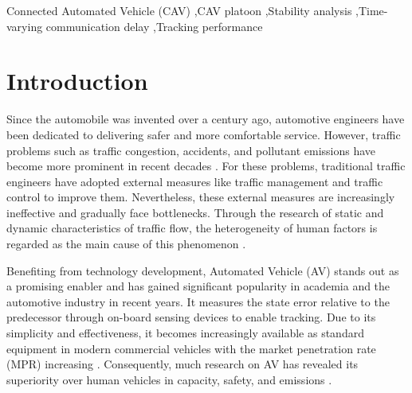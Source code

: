 \documentclass[a4paper]{cas-sc}
\begin{document}
\begin{keywords}
  Connected Automated Vehicle (CAV) \sep CAV platoon \sep Stability analysis \sep Time-varying communication delay \sep Tracking performance
\end{keywords}


\maketitle

\section{Introduction}
\label{Section 1}
Since the automobile was invented over a century ago, automotive engineers have been dedicated to delivering safer and more comfortable service. However, traffic problems such as traffic congestion, accidents, and pollutant emissions have become more prominent in recent decades \citep{schrank_urban_2019,Jin2016,ruan_impacts_2022}. For these problems, traditional traffic engineers have adopted external measures like traffic management and traffic control to improve them. Nevertheless, these external measures are increasingly ineffective and gradually face bottlenecks. Through the research of static and dynamic characteristics of traffic flow, the heterogeneity of human factors is regarded as the main cause of this phenomenon \citep{Zhong2020,Arem2016,Ye2018,Ruan2021}.

Benefiting from technology development, Automated Vehicle (AV) stands out as a promising enabler and has gained significant popularity in academia and the automotive industry in recent years. It measures the state error relative to the predecessor through on-board sensing devices to enable tracking. Due to its simplicity and effectiveness, it becomes increasingly available as standard equipment in modern commercial vehicles with the market penetration rate (MPR) increasing \citep{Wilson2011,Wilson2008}. Consequently, much research on AV has revealed its superiority over human vehicles in capacity, safety, and emissions \citep{goni-ros_using_2019,Nikolos2015,kesting_enhanced_2010}.
\end{document}
